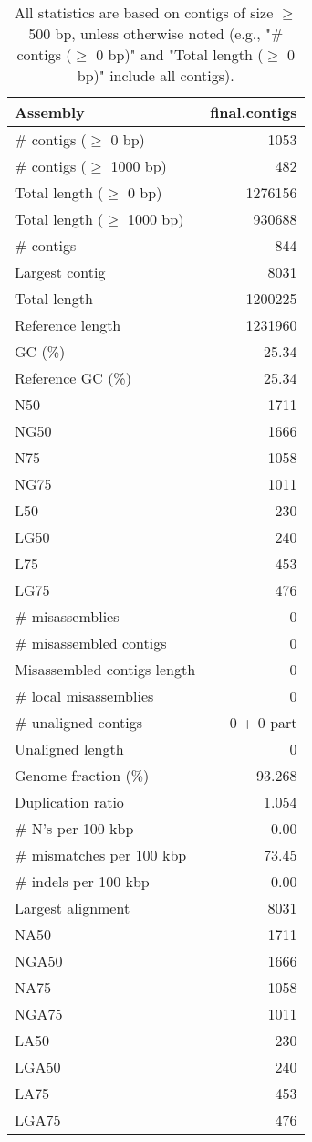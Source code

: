 \documentclass[12pt,a4paper]{article}
\begin{document}
\begin{table}[ht]
\begin{center}
\caption{All statistics are based on contigs of size $\geq$ 500 bp, unless otherwise noted (e.g., "\# contigs ($\geq$ 0 bp)" and "Total length ($\geq$ 0 bp)" include all contigs).}
\begin{tabular}{|l*{1}{|r}|}
\hline
Assembly & final.contigs \\ \hline
\# contigs ($\geq$ 0 bp) & 1053 \\ \hline
\# contigs ($\geq$ 1000 bp) & 482 \\ \hline
Total length ($\geq$ 0 bp) & 1276156 \\ \hline
Total length ($\geq$ 1000 bp) & 930688 \\ \hline
\# contigs & 844 \\ \hline
Largest contig & 8031 \\ \hline
Total length & 1200225 \\ \hline
Reference length & 1231960 \\ \hline
GC (\%) & 25.34 \\ \hline
Reference GC (\%) & 25.34 \\ \hline
N50 & 1711 \\ \hline
NG50 & 1666 \\ \hline
N75 & 1058 \\ \hline
NG75 & 1011 \\ \hline
L50 & 230 \\ \hline
LG50 & 240 \\ \hline
L75 & 453 \\ \hline
LG75 & 476 \\ \hline
\# misassemblies & 0 \\ \hline
\# misassembled contigs & 0 \\ \hline
Misassembled contigs length & 0 \\ \hline
\# local misassemblies & 0 \\ \hline
\# unaligned contigs & 0 + 0 part \\ \hline
Unaligned length & 0 \\ \hline
Genome fraction (\%) & 93.268 \\ \hline
Duplication ratio & 1.054 \\ \hline
\# N's per 100 kbp & 0.00 \\ \hline
\# mismatches per 100 kbp & 73.45 \\ \hline
\# indels per 100 kbp & 0.00 \\ \hline
Largest alignment & 8031 \\ \hline
NA50 & 1711 \\ \hline
NGA50 & 1666 \\ \hline
NA75 & 1058 \\ \hline
NGA75 & 1011 \\ \hline
LA50 & 230 \\ \hline
LGA50 & 240 \\ \hline
LA75 & 453 \\ \hline
LGA75 & 476 \\ \hline
\end{tabular}
\end{center}
\end{table}
\end{document}
